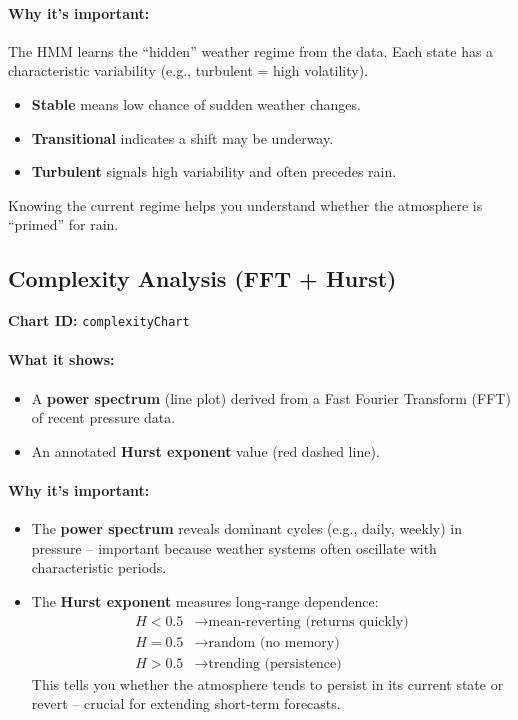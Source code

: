 \documentclass[11pt,a4paper]{article}
\begin{document}
	\paragraph{Why it’s important:}
	The HMM learns the “hidden” weather regime from the data. Each state has a characteristic variability (e.g., turbulent = high volatility).
	\begin{itemize}
		\item \textbf{Stable} means low chance of sudden weather changes.
		\item \textbf{Transitional} indicates a shift may be underway.
		\item \textbf{Turbulent} signals high variability and often precedes rain.
	\end{itemize}
	Knowing the current regime helps you understand whether the atmosphere is “primed” for rain.
	
	\subsection{Complexity Analysis (FFT + Hurst)}
	\textbf{Chart ID:} \texttt{complexityChart}
	
	\paragraph{What it shows:}
	\begin{itemize}
		\item A \textbf{power spectrum} (line plot) derived from a Fast Fourier Transform (FFT) of recent pressure data.
		\item An annotated \textbf{Hurst exponent} value (red dashed line).
	\end{itemize}
	
	\paragraph{Why it’s important:}
	\begin{itemize}
		\item The \textbf{power spectrum} reveals dominant cycles (e.g., daily, weekly) in pressure – important because weather systems often oscillate with characteristic periods.
		\item The \textbf{Hurst exponent} measures long‑range dependence:
		\begin{align*}
			H < 0.5 &\rightarrow \text{mean‑reverting (returns quickly)}\\
			H = 0.5 &\rightarrow \text{random (no memory)}\\
			H > 0.5 &\rightarrow \text{trending (persistence)}
		\end{align*}
		This tells you whether the atmosphere tends to persist in its current state or revert – crucial for extending short‑term forecasts.
	\end{itemize}
	
\end{document}

